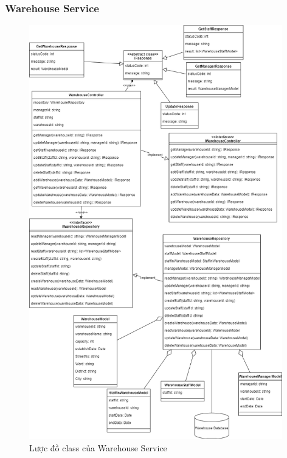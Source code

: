 \subsubsection{Warehouse Service}
\begin{figure}[!htp]
	\centering
	\includegraphics[width=11cm]{img/Architecture/service/WarehouseService.png}
	\newline
	\caption{Lược đồ class của Warehouse Service}
\end{figure}


